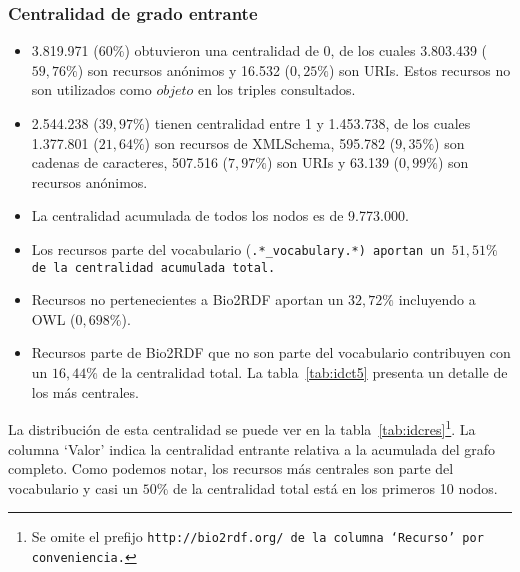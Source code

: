 \subsubsection{Centralidad de grado entrante}
\begin{itemize}
  \item
    3.819.971 ($60\%$) obtuvieron una centralidad de 0, de los cuales
    3.803.439 ($59,76\%$) son recursos anónimos y 16.532 ($0,25\%$) son URIs.
    Estos recursos no son utilizados como $objeto$ en los triples consultados.
  \item
    2.544.238 ($39,97\%$) tienen centralidad entre 1 y 1.453.738, de los cuales
    1.377.801 ($21,64\%$) son recursos de XMLSchema, 
    595.782 ($9,35\%$) son cadenas de caracteres,
    507.516 ($7,97\%$) son URIs y
    63.139 ($0,99\%$) son recursos anónimos.
  \item La centralidad acumulada de todos los nodos es de 9.773.000.
  \item 
    Los recursos parte del vocabulario (\tt{.*\_vocabulary.*}) aportan un 
    $51,51\%$ de la centralidad acumulada total.
  \item
    Recursos no pertenecientes a Bio2RDF aportan un $32,72\%$ incluyendo a OWL 
    ($0,698\%$).
  \item 
    Recursos parte de Bio2RDF que no son parte del vocabulario contribuyen con
    un $16,44\%$ de la centralidad total. La tabla~\ref{tab:idct5} presenta un
    detalle de los más centrales.
\end{itemize}

La distribución de esta centralidad se puede ver en la
tabla~\ref{tab:idcres}\footnote{Se omite el prefijo \tt{http://bio2rdf.org/} de
la columna `Recurso' por conveniencia.}.
La columna `Valor' indica la centralidad entrante relativa a la acumulada del
grafo completo.
Como podemos notar, los recursos más centrales son parte del vocabulario y casi
un $50\%$ de la centralidad total está en los primeros 10 nodos.

